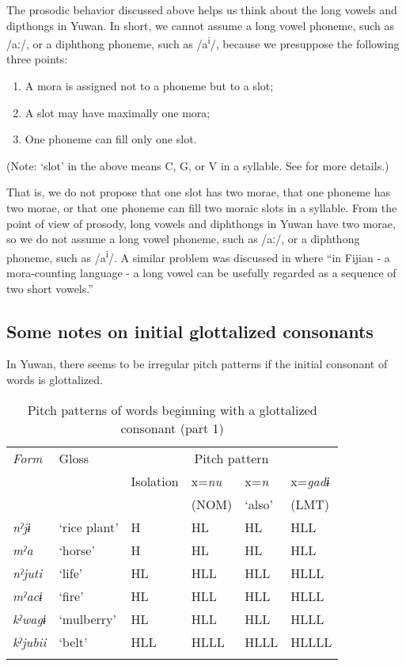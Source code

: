 The prosodic behavior discussed above helps us think about the long vowels and dipthongs in Yuwan. In short, we cannot assume a long vowel phoneme, such as /aː/, or a diphthong phoneme, such as /a\textsuperscript{i}/, because we presuppose the following three points:

\begin{enumerate}[label=\alph*.]
\item A mora is assigned not to a phoneme but to a slot;
\item A slot may have maximally one mora;
\item One phoneme can fill only one slot.
\end{enumerate}

(Note: ‘slot’ in the above means C, G, or V in a syllable. See  for more details.)

That is, we do not propose that one slot has two morae, that one phoneme has two morae, or that one phoneme can fill two moraic slots in a syllable. From the point of view of prosody, long vowels and diphthongs in Yuwan have two morae, so we do not assume a long vowel phoneme, such as /aː/, or a diphthong phoneme, such as /a\textsuperscript{i}/. A similar problem was discussed in \citet[196-199]{Dixon2010} where “in Fijian - a mora-counting language - a long vowel can be usefully regarded as a sequence of two short vowels.”

\subsection{Some notes on initial glottalized consonants}
\label{bkm:Ref347180628}\hypertarget{RefHeadingToc395696985}{}
In Yuwan, there seems to be irregular pitch patterns if the initial consonant of words is glottalized.

\begin{table}
\caption{Pitch patterns of words beginning with a glottalized consonant (part 1)}
\begin{tabular}{>{\itshape}llllll}
\lsptoprule
\normalfont Form & Gloss & \multicolumn{4}{c}{Pitch pattern}\\\cmidrule(lr){3-6}
     &       & Isolation & x=\textit{nu} & x=\textit{n} & x=\textit{gadɨ}\\
     &       &           & (NOM) & ‘also’ & (LMT)\\\midrule
nˀjɨ    &  ‘rice plant’ &  H   & HL   & HL   &  HLL\\
mˀa     &  ‘horse’       &  H   & HL   & HL   &  HLL\\
nˀjuti  &  ‘life’     &  HL  & HLL  & HLL  &  HLLL\\
mˀacɨ   &  ‘fire’      &  HL  & HLL  & HLL  &  HLLL\\
kˀwagɨ  &  ‘mulberry’ &  HL  & HLL  & HLL  &  HLLL\\
kˀjubii &  ‘belt’    &  HLL & HLLL & HLLL &  HLLLL\\
\lspbottomrule
\end{tabular}
\end{table}

